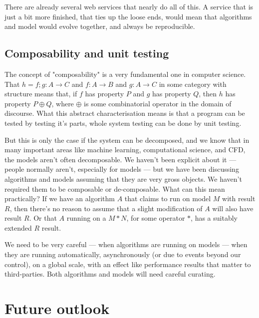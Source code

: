 \documentclass[conference]{IEEEtran}
\begin{document}
There are already several web services that nearly do all of this. A
service that is just a bit more finished, that ties up the loose ends,
would mean that algorithms and model would evolve together, and always
be reproducible.

\subsection{Composability and unit testing}


The concept of "composability" is a very fundamental one in computer science. 
That $h = f;g : A \rightarrow C$ and $f : A \rightarrow B$ and $g : A \rightarrow C$ 
in some category with structure means that, if $f$ has property $P$ and $g$ has
property $Q$, then $h$ has property $P \oplus Q$, where $\oplus$ is some 
combinatorial operator in the domain of discourse. What this abstract 
characterisation means is that a program can be tested by testing it's parts,
whole system testing can be done by unit testing. 

But this is only the case if the system can be decomposed, and we know that in
many important areas like machine learning, computational science, and CFD,
the models aren't often decomposable.  We haven't been explicit about it ---
people normally aren't, especially for models ---  but we have been discussing
algorithms and models assuming that they are very gross objects. We haven't
required them to be composable or de-composable. What can this mean
practically? If we have an algorithm $A$ that claims to run on model $M$ with
result $R$, then there's no reason to assume that a slight modification of $A$
will also have result $R$. Or that $A$ running on a $M * N$, for some operator
$*$, has a suitably extended $R$ result.

We need to be very careful --- when algorithms are running on models --- when
they are running automatically, asynchronously (or due to events beyond our
control), on a global scale, with an effect like performance results that
matter to third-parties. Both algorithms and  models will need careful
curating.





\section{Future outlook}
\end{document}
